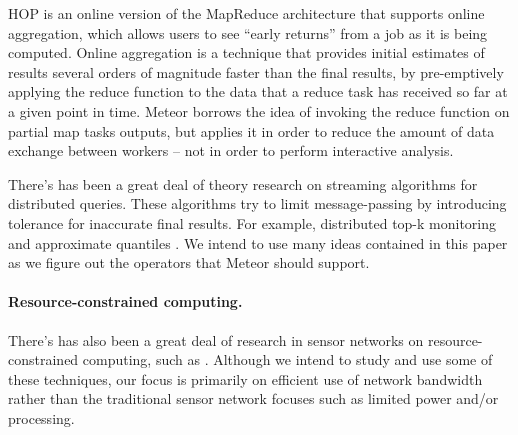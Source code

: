 HOP \cite{hop} is an online version of the MapReduce architecture that supports online aggregation, which allows users to see “early returns” from a job as it is being computed. Online aggregation is a technique that provides initial estimates of results several orders of magnitude faster than the final results, by pre-emptively applying the reduce function to the data that a reduce task has received so far at a given point in time. Meteor borrows the idea of  invoking the reduce function on partial map tasks outputs, but applies it in order to reduce the amount of data exchange between workers – not in order to perform interactive analysis.

There’s has been a great deal of theory research on streaming algorithms for distributed queries. These algorithms try to limit message-passing by introducing tolerance for inaccurate final results. For example, distributed top-k monitoring \cite{topk} and approximate quantiles \cite{approxquant}. We intend to use many ideas contained in this paper as we figure out the operators that Meteor should support. 

\paragraph{Resource-constrained computing.}
There’s has also been a great deal of research in sensor networks on resource-constrained computing, such as \cite{tag}. Although we intend to study and use some of these techniques, our focus is primarily on efficient use of network bandwidth rather than the traditional sensor network focuses such as limited power and/or processing.  
